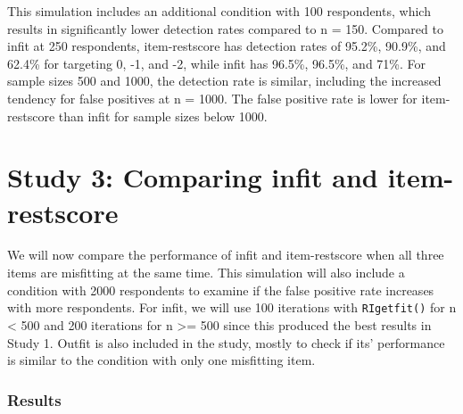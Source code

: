 \documentclass[
  letterpaper,
  DIV=11,
  numbers=noendperiod]{scrartcl}
\begin{document}
This simulation includes an additional condition with 100 respondents,
which results in significantly lower detection rates compared to n =
150. Compared to infit at 250 respondents, item-restscore has detection
rates of 95.2\%, 90.9\%, and 62.4\% for targeting 0, -1, and -2, while
infit has 96.5\%, 96.5\%, and 71\%. For sample sizes 500 and 1000, the
detection rate is similar, including the increased tendency for false
positives at n = 1000. The false positive rate is lower for
item-restscore than infit for sample sizes below 1000.

\section{Study 3: Comparing infit and
item-restscore}\label{study-3-comparing-infit-and-item-restscore}

We will now compare the performance of infit and item-restscore when all
three items are misfitting at the same time. This simulation will also
include a condition with 2000 respondents to examine if the false
positive rate increases with more respondents. For infit, we will use
100 iterations with \texttt{RIgetfit()} for n \textless{} 500 and 200
iterations for n \textgreater= 500 since this produced the best results
in Study 1. Outfit is also included in the study, mostly to check if
its' performance is similar to the condition with only one misfitting
item.

\subsubsection{Results}\label{results-2}
\end{document}
